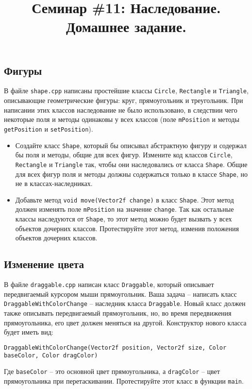 \documentclass{article}
\begin{document}
\title{Семинар \#11: Наследование. Домашнее задание.\vspace{-5ex}}\date{}\maketitle


\subsection{Фигуры}
В файле \texttt{shape.cpp} написаны простейшие классы \texttt{Circle}, \texttt{Rectangle} и \texttt{Triangle}, описывающие геометрические фигуры: круг, прямоугольник и треугольник. При написании этих классов наследование не было использовано, в следствии чего некоторые поля и методы одинаковы у всех классов (поле \texttt{mPosition} и методы \texttt{getPosition} и \texttt{setPosition}).

\begin{itemize}
\item Создайте класс \texttt{Shape}, который бы описывал абстрактную фигуру и содержал бы поля и методы, общие для всех фигур. Измените код классов \texttt{Circle}, \texttt{Rectangle} и \texttt{Triangle} так, чтобы они наследовались от класса \texttt{Shape}. Общие для всех фигур поля и методы должны содержаться только в классе \texttt{Shape}, но не в классах-наследниках.

\item Добавьте метод \texttt{void move(Vector2f change)} в класс \texttt{Shape}. Этот метод должен изменять поле \texttt{mPosition} на значение \texttt{change}. Так как остальные классы наследуются от \texttt{Shape}, то этот метод можно будет вызвать у всех объектов дочерних классов. Протестируйте этот метод, изменив положения объектов дочерних классов.
\end{itemize}


\subsection{Изменение цвета}
В файле \texttt{draggable.cpp} написан класс \texttt{Draggable}, который описывает передвигаемый курсором мыши прямоугольник. Ваша задача -- написать класс \texttt{DraggableWithColorChange} -- наследник класса \texttt{Draggable}. Новый класс должен также описывать передвигаемый прямоугольник, но, во время передвижения прямоугольника, его цвет должен меняться на другой. Конструктор нового класса будет иметь вид:
\begin{lstlisting}
DraggableWithColorChange(Vector2f position, Vector2f size, Color baseColor, Color dragColor) 
\end{lstlisting}
Где \texttt{baseColor} -- это основной цвет прямоугольника, а \texttt{dragColor} -- цвет прямоугольника при перетаскивании.
Протестируйте этот класс в функции \texttt{main}.
\end{document}
